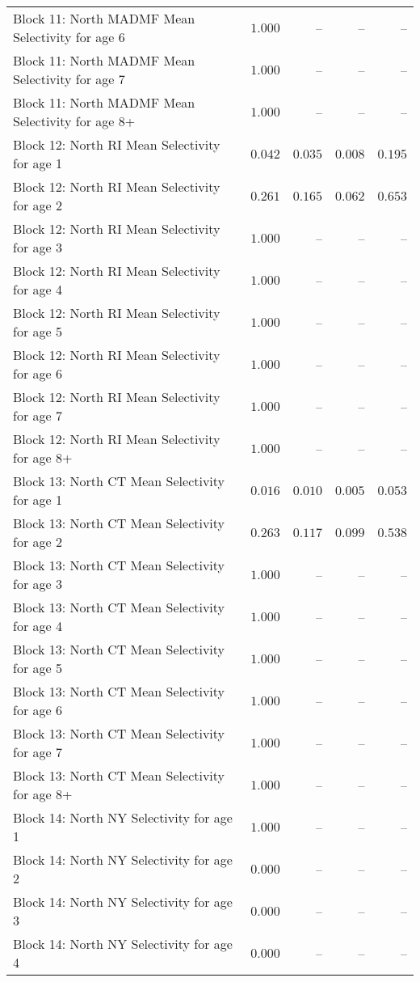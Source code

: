 \documentclass[
]{article}
\begin{document}
\begin{landscape}
\begin{longtable}[t]{lrrrr}
Block 11: North MADMF Mean Selectivity for age 6 & $1.000$ & -- & -- & --\\
Block 11: North MADMF Mean Selectivity for age 7 & $1.000$ & -- & -- & --\\
Block 11: North MADMF Mean Selectivity for age 8+ & $1.000$ & -- & -- & --\\
\addlinespace
Block 12: North RI Mean Selectivity for age 1 & $0.042$ & $0.035$ & $0.008$ & $0.195$\\
Block 12: North RI Mean Selectivity for age 2 & $0.261$ & $0.165$ & $0.062$ & $0.653$\\
Block 12: North RI Mean Selectivity for age 3 & $1.000$ & -- & -- & --\\
Block 12: North RI Mean Selectivity for age 4 & $1.000$ & -- & -- & --\\
Block 12: North RI Mean Selectivity for age 5 & $1.000$ & -- & -- & --\\
\addlinespace
Block 12: North RI Mean Selectivity for age 6 & $1.000$ & -- & -- & --\\
Block 12: North RI Mean Selectivity for age 7 & $1.000$ & -- & -- & --\\
Block 12: North RI Mean Selectivity for age 8+ & $1.000$ & -- & -- & --\\
Block 13: North CT Mean Selectivity for age 1 & $0.016$ & $0.010$ & $0.005$ & $0.053$\\
Block 13: North CT Mean Selectivity for age 2 & $0.263$ & $0.117$ & $0.099$ & $0.538$\\
\addlinespace
Block 13: North CT Mean Selectivity for age 3 & $1.000$ & -- & -- & --\\
Block 13: North CT Mean Selectivity for age 4 & $1.000$ & -- & -- & --\\
Block 13: North CT Mean Selectivity for age 5 & $1.000$ & -- & -- & --\\
Block 13: North CT Mean Selectivity for age 6 & $1.000$ & -- & -- & --\\
Block 13: North CT Mean Selectivity for age 7 & $1.000$ & -- & -- & --\\
\addlinespace
Block 13: North CT Mean Selectivity for age 8+ & $1.000$ & -- & -- & --\\
Block 14: North NY Selectivity for age 1 & $1.000$ & -- & -- & --\\
Block 14: North NY Selectivity for age 2 & $0.000$ & -- & -- & --\\
Block 14: North NY Selectivity for age 3 & $0.000$ & -- & -- & --\\
Block 14: North NY Selectivity for age 4 & $0.000$ & -- & -- & --\\

\end{longtable}
\end{landscape}
\end{document}
